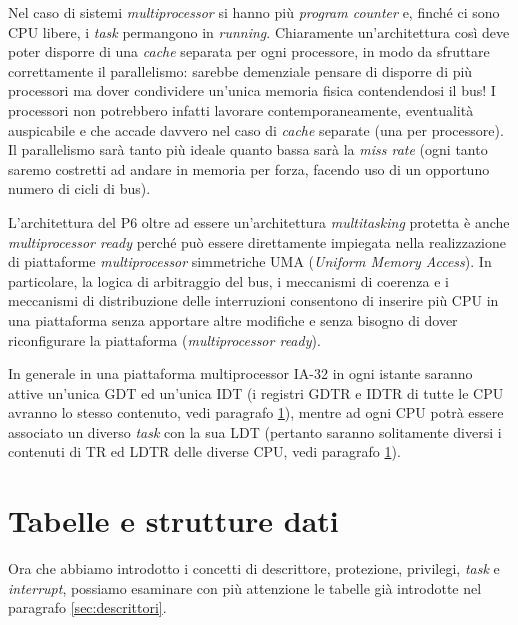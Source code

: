 Nel caso di sistemi \textit{multiprocessor} si hanno più \textit{program counter} e, finché ci sono CPU libere, i \textit{task} permangono in \textit{running}. Chiaramente un'architettura così deve poter disporre di una \textit{cache} separata per ogni processore, in modo da sfruttare correttamente il parallelismo: sarebbe demenziale pensare di disporre di più processori ma dover condividere un'unica memoria fisica contendendosi il bus! I processori non potrebbero infatti lavorare contemporaneamente, eventualità auspicabile e che accade davvero nel caso di \textit{cache} separate (una per processore). Il parallelismo sarà tanto più ideale quanto bassa sarà la \textit{miss rate} (ogni tanto saremo costretti ad andare in memoria per forza, facendo uso di un opportuno numero di cicli di bus).

L'architettura del P6 oltre ad essere un'architettura \textit{multitasking} protetta è anche \textit{multiprocessor ready} perché può essere direttamente impiegata nella realizzazione di piattaforme
\textit{multiprocessor} simmetriche UMA (\textit{Uniform Memory Access}). In particolare, la logica di arbitraggio del bus,  i meccanismi di coerenza e i meccanismi di distribuzione delle interruzioni consentono di inserire più CPU in una piattaforma senza apportare altre modifiche e senza bisogno di dover riconfigurare la piattaforma (\textit{multiprocessor ready}).

In generale in una piattaforma multiprocessor IA-32 in ogni istante saranno attive un'unica GDT ed un'unica IDT (i registri GDTR e IDTR di tutte le CPU avranno lo stesso contenuto, vedi paragrafo \ref{sec:tabelleStruttureDati}), mentre ad ogni CPU potrà essere associato un diverso \textit{task} con la sua LDT (pertanto saranno solitamente diversi i contenuti di TR ed LDTR delle diverse CPU, vedi paragrafo \ref{sec:tabelleStruttureDati}).

\section{Tabelle e strutture dati}
\label{sec:tabelleStruttureDati}

Ora che abbiamo introdotto i concetti di descrittore, protezione, privilegi, \textit{task} e \textit{interrupt}, possiamo esaminare con più attenzione le tabelle già introdotte nel paragrafo \ref{sec:descrittori}.

